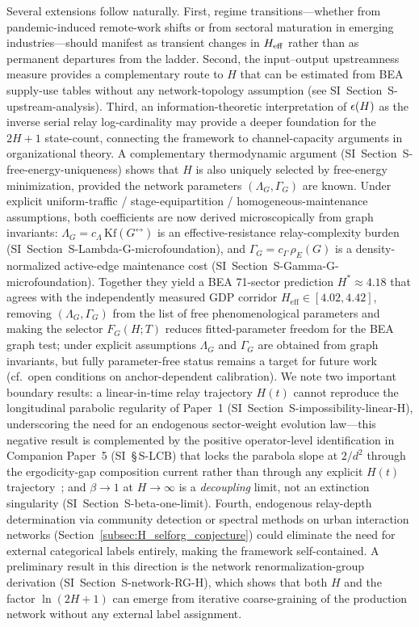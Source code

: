 Several extensions follow naturally.
First, regime transitions---whether from pandemic-induced remote-work shifts
or from sectoral maturation in emerging industries---should manifest as
transient changes in \(H_{\mathrm{eff}}\) rather than as permanent departures from the
ladder.
Second, the input--output upstreamness measure provides a complementary route
to \(H\) that can be estimated from BEA supply-use tables without any
network-topology assumption (see SI~Section~\textsf{S-upstream-analysis}).
Third, an information-theoretic interpretation of \(\epsilon\!\left(H\right)\) as the
inverse serial relay log-cardinality may provide a deeper foundation for the
\(2H+1\) state-count, connecting the framework to channel-capacity arguments
in organizational theory.
A complementary thermodynamic argument (SI~Section~\textsf{S-free-energy-uniqueness})
shows that $H$ is also uniquely selected by free-energy minimization, provided
the network parameters $(\Lambda_G,\Gamma_G)$ are known.
Under explicit uniform-traffic / stage-equipartition / homogeneous-maintenance
assumptions, both coefficients are now derived microscopically from graph
invariants: $\Lambda_G=c_\Lambda\,\mathrm{Kf}(G^{\leftrightarrow})$ is an
effective-resistance relay-complexity burden
(SI~Section~\textsf{S-Lambda-G-microfoundation}), and
$\Gamma_G=c_\Gamma\,\rho_E(G)$ is a density-normalized active-edge maintenance
cost (SI~Section~\textsf{S-Gamma-G-microfoundation}).
Together they yield a BEA 71-sector prediction
$H^{\ast}\approx 4.18$ that agrees with the independently measured
GDP corridor $H_{\mathrm{eff}}\in[4.02,4.42]$, removing $(\Lambda_G,\Gamma_G)$
from the list of free phenomenological parameters and making the selector
$F_G(H;T)$ reduces fitted-parameter freedom for the BEA graph test; under explicit assumptions $\Lambda_G$ and $\Gamma_G$ are obtained from graph invariants, but fully parameter-free status remains a target for future work (cf.\ open conditions on anchor-dependent calibration).
We note two important boundary results:
a linear-in-time relay trajectory $H(t)$ cannot reproduce the
longitudinal parabolic regularity of Paper~1
(SI~Section~\textsf{S-impossibility-linear-H}), underscoring the need for
an endogenous sector-weight evolution law---this negative result is
complemented by the positive operator-level identification in Companion
Paper~5 (SI~\S\,S-LCB) that locks the parabola slope at $2/d^{2}$ through
the ergodicity-gap composition current rather than through any explicit
$H(t)$ trajectory~\cite{Kato2026e};
and $\beta\to 1$ at $H\to\infty$ is a \emph{decoupling} limit, not an
extinction singularity (SI~Section~\textsf{S-beta-one-limit}).
Fourth, endogenous relay-depth determination via community detection or
spectral methods on urban interaction networks
(Section~\ref{subsec:H_selforg_conjecture}) could eliminate the need for external
categorical labels entirely, making the framework self-contained.
A preliminary result in this direction is the network
renormalization-group derivation
(SI~Section~\textsf{S-network-RG-H}), which shows that both $H$ and
the factor $\ln(2H+1)$ can emerge from iterative coarse-graining of
the production network without any external label assignment.

